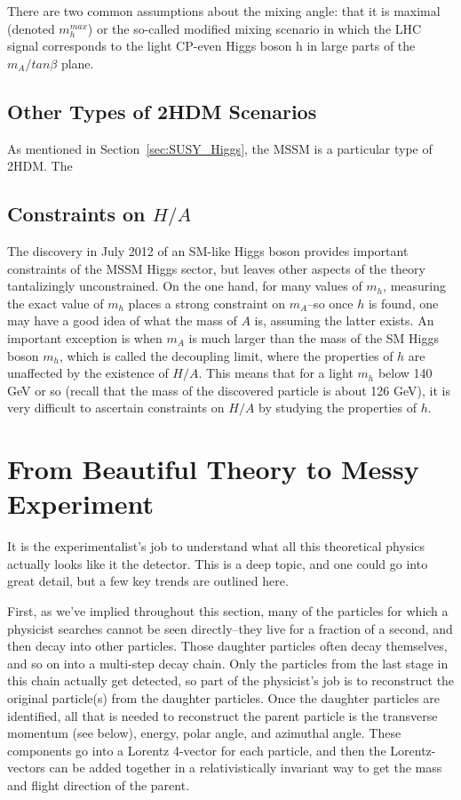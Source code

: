 There are two common assumptions about the mixing angle: that it is maximal (denoted $m_h^{max}$) or the so-called modified mixing scenario \cite{Carena-2} in which the LHC signal corresponds to the light CP-even Higgs boson h in large parts of the $m_A/tan\beta$ plane.


\subsection{Other Types of 2HDM Scenarios}
As mentioned in Section~\ref{sec:SUSY_Higgs}, the MSSM is a particular type of 2HDM.  The   


\subsection{Constraints on $H/A$}
The discovery in July 2012 of an SM-like Higgs boson provides important constraints of the MSSM Higgs sector, but leaves other aspects of the theory tantalizingly unconstrained.  On the one hand, for many values of $m_h$, measuring the exact value of $m_h$ places a strong constraint on $m_A$--so once $h$ is found, one may have a good idea of what the mass of $A$ is, assuming the latter exists.  An important exception is when $m_A$ is much larger than the mass of the SM Higgs boson $m_h$, which is called the decoupling limit, where the properties of $h$ are unaffected by the existence of $H/A$.  This means that for a light $m_h$ below 140 GeV or so (recall that the mass of the discovered particle is about 126 GeV), it is very difficult to ascertain constraints on $H/A$ by studying the properties of $h$.   


\section{From Beautiful Theory to Messy Experiment}

It is the experimentalist's job to understand what all this theoretical physics actually looks like it the detector.  This is a deep topic, and one could go into great detail, but a few key trends are outlined here.

First, as we've implied throughout this section, many of the particles for which a physicist searches cannot be seen directly--they live for a fraction of a second, and then decay into other particles.  Those daughter particles often decay themselves, and so on into a  multi-step decay chain.  Only the particles from the last stage in this chain actually get detected, so part of the physicist's job is to reconstruct the original particle(s) from the daughter particles.  Once the daughter particles are identified, all that is needed to reconstruct the parent particle is the transverse momentum (see below), energy, polar angle, and azimuthal angle.  These components go into a Lorentz 4-vector for each particle, and then the Lorentz-vectors can be added together in a relativistically invariant way to get the mass and flight direction of the parent.

